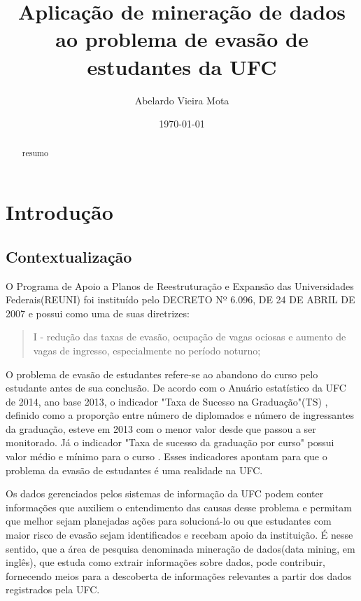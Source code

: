 \documentclass[a4paper]{article}
\title{Aplicação de mineração de dados ao problema de evasão de estudantes da UFC}
\author{Abelardo Vieira Mota}
\date{\today}
\begin{document}
\maketitle

\begin{abstract}
resumo
\end{abstract}

\tableofcontents

\section{Introdução}

\subsection{Contextualização}
O Programa de Apoio a Planos de Reestruturação e Expansão das Universidades Federais(REUNI) foi instituído pelo DECRETO Nº 6.096, DE 24 DE ABRIL DE 2007 e possui como uma de suas diretrizes:
\begin{quote}
I - redução das taxas de evasão, ocupação de vagas ociosas e aumento de vagas de ingresso, especialmente no período noturno;
\end{quote}

O problema de evasão de estudantes refere-se ao abandono do curso pelo estudante antes de sua conclusão. De acordo com o Anuário estatístico da UFC de 2014, ano base 2013, o indicador "Taxa de Sucesso na Graduação"(TS) , definido como a proporção entre número de diplomados e número de ingressantes da graduação, esteve em 2013 com o menor valor desde que passou a ser monitorado. Já o indicador "Taxa de sucesso da graduação por curso"  possui valor médio  e mínimo  para o curso . Esses indicadores apontam para que o problema da evasão de estudantes é uma realidade na UFC. 

Os dados gerenciados pelos sistemas de informação da UFC podem conter informações que auxiliem o entendimento das causas desse problema e permitam que melhor sejam planejadas ações para solucioná-lo ou que estudantes com maior risco de evasão sejam identificados e recebam apoio da instituição. É nesse sentido, que a área de pesquisa denominada mineração de dados(data mining, em inglês), que estuda como extrair informações sobre dados, pode contribuir, fornecendo meios para a descoberta de informações relevantes a partir dos dados registrados pela UFC.
\end{document}
